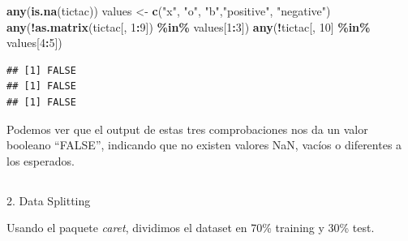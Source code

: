 \documentclass[
]{article}
\newenvironment{Shaded}{\begin{snugshade}}{\end{snugshade}}
\newcommand{\AttributeTok}[1]{\textcolor[rgb]{0.13,0.29,0.53}{#1}}
\newcommand{\ConstantTok}[1]{\textcolor[rgb]{0.56,0.35,0.01}{#1}}
\newcommand{\DecValTok}[1]{\textcolor[rgb]{0.00,0.00,0.81}{#1}}
\newcommand{\FunctionTok}[1]{\textcolor[rgb]{0.13,0.29,0.53}{\textbf{#1}}}
\newcommand{\NormalTok}[1]{#1}
\newcommand{\OtherTok}[1]{\textcolor[rgb]{0.56,0.35,0.01}{#1}}
\newcommand{\SpecialCharTok}[1]{\textcolor[rgb]{0.81,0.36,0.00}{\textbf{#1}}}
\newcommand{\StringTok}[1]{\textcolor[rgb]{0.31,0.60,0.02}{#1}}
\begin{document}
\begin{Shaded}
\begin{Highlighting}[]
\FunctionTok{any}\NormalTok{(}\FunctionTok{is.na}\NormalTok{(tictac))}
\NormalTok{values }\OtherTok{\textless{}{-}} \FunctionTok{c}\NormalTok{(}\StringTok{"x"}\NormalTok{, }\StringTok{"o"}\NormalTok{, }\StringTok{"b"}\NormalTok{,}\StringTok{"positive"}\NormalTok{, }\StringTok{"negative"}\NormalTok{)}
\FunctionTok{any}\NormalTok{(}\SpecialCharTok{!}\FunctionTok{as.matrix}\NormalTok{(tictac[, }\DecValTok{1}\SpecialCharTok{:}\DecValTok{9}\NormalTok{]) }\SpecialCharTok{\%in\%}\NormalTok{ values[}\DecValTok{1}\SpecialCharTok{:}\DecValTok{3}\NormalTok{])}
\FunctionTok{any}\NormalTok{(}\SpecialCharTok{!}\NormalTok{tictac[, }\DecValTok{10}\NormalTok{] }\SpecialCharTok{\%in\%}\NormalTok{ values[}\DecValTok{4}\SpecialCharTok{:}\DecValTok{5}\NormalTok{])}
\end{Highlighting}
\end{Shaded}

\begin{verbatim}
## [1] FALSE
## [1] FALSE
## [1] FALSE
\end{verbatim}

Podemos ver que el output de estas tres comprobaciones nos da un valor
booleano ``FALSE'', indicando que no existen valores NaN, vacíos o
diferentes a los esperados.

\subsection{}\label{section-4}

2. Data Splitting

Usando el paquete \emph{caret}, dividimos el dataset en 70\% training y
30\% test.

\begin{Shaded}
\end{Shaded}
\end{document}
